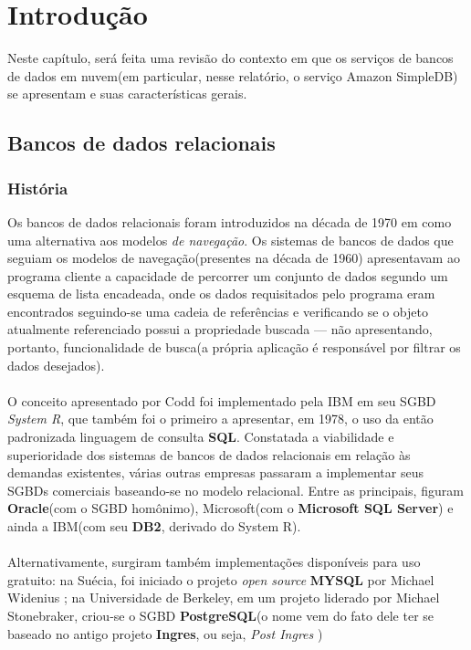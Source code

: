 \chapter{Introdução}
	Neste capítulo, será feita uma revisão do contexto em que os serviços de bancos de dados em nuvem(em particular, nesse relatório, o serviço Amazon SimpleDB) se apresentam e suas características gerais.
	
\section{Bancos de dados relacionais}
\subsection{História}
	Os bancos de dados relacionais foram introduzidos na década de 1970 em \cite{codd1970} como uma alternativa aos modelos \textit{de navegação}\cite{wikiNavDb}. Os sistemas de bancos de dados que seguiam os modelos de navegação(presentes na década de 1960) apresentavam ao programa cliente a capacidade de percorrer um conjunto de dados segundo um esquema de lista encadeada, onde os dados requisitados pelo programa eram encontrados seguindo-se uma cadeia de referências e verificando se o objeto atualmente referenciado possui a propriedade buscada --- não apresentando, portanto, funcionalidade de busca(a própria aplicação é responsável por filtrar os dados desejados).\\\\
	O conceito apresentado por Codd foi implementado pela IBM em seu SGBD \textit{System R}, que também foi o primeiro a apresentar, em 1978, o uso da então padronizada linguagem de consulta \textbf{SQL}. Constatada a viabilidade e superioridade dos sistemas de bancos de dados relacionais em relação às demandas existentes, várias outras empresas passaram a implementar seus SGBDs comerciais baseando-se no modelo relacional. Entre as principais, figuram \textbf{Oracle}(com o SGBD homônimo), Microsoft(com o \textbf{Microsoft SQL Server}) e ainda a IBM(com seu \textbf{DB2}, derivado do System R). \\\\
	Alternativamente, surgiram também implementações disponíveis para uso gratuito: na Suécia, foi iniciado o projeto \textit{open source} \textbf{MYSQL} por Michael Widenius \cite{wikiMySQL}; na Universidade de Berkeley, em um projeto liderado por Michael Stonebraker, criou-se o SGBD \textbf{PostgreSQL}(o nome vem do fato dele ter se baseado no antigo projeto \textbf{Ingres}, ou seja, \textit{Post Ingres} \cite{wikiPSql})
\\\\\\\\\\

